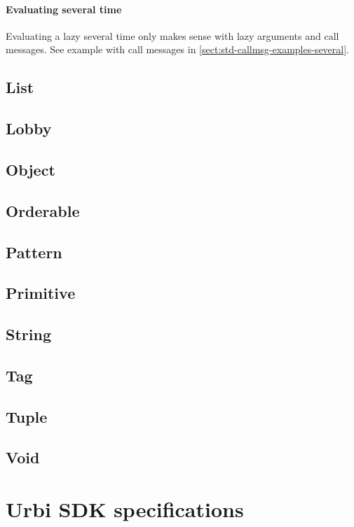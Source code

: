 \documentclass[openright,twoside,12pt]{report}
\newcommand{\urbi}{Urbi\xspace}
\newcommand{\sect}[1]{\autoref{sect:#1}}
\begin{document}
\subsubsection{Evaluating several time}

Evaluating a lazy several time only makes sense with lazy arguments
and call messages. See example with call messages in
\sect{std-callmsg-examples-several}.

\section{List}
\section{Lobby}
\section{Object}
\section{Orderable}
\label{sect:std-orderable}
\section{Pattern}
\section{Primitive}
\section{String}
\section{Tag}
\section{Tuple}
\section{Void}
\label{sect:std-void}

\chapter{\urbi SDK specifications}

\end{document}
